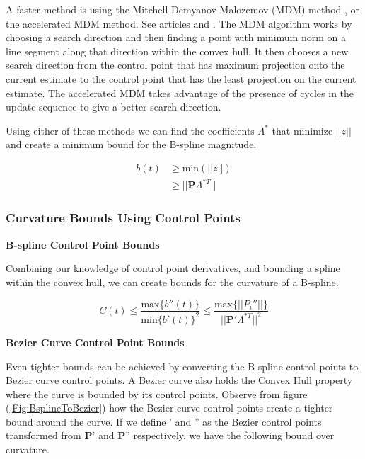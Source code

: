 \documentclass{article}
\begin{document}
A faster method is using the Mitchell-Demyanov-Malozemov (MDM) method \cite{ARTICLE:Kaown}, or the accelerated MDM method. See articles \cite{ARTICLE:Vladimirovich} and \cite{ARTICLE:Barbero}. The MDM algorithm works by choosing a search direction and then finding a point with minimum norm on a line segment along that direction within the convex hull. It then chooses a new search direction from the control point that has maximum projection onto the current estimate to the control point that has the least projection on the current estimate. The accelerated MDM takes advantage of the presence of cycles in the update sequence to give a better search direction.

Using either of these methods we can find the coefficients  \(\Lambda^*\)  that minimize \(||z||\) and create a minimum bound for the B-spline magnitude.

\begin{equation}
\begin{aligned}
    b(t) & \geq \text{min}(||z||) \\
    & \geq ||\textbf{P} \Lambda^{*T}||
\end{aligned}
\end{equation}

\subsubsection{Curvature Bounds Using Control Points}

\hspace{1cm}

\textbf{B-spline Control Point Bounds}

\hspace{1cm}

Combining our knowledge of control point derivatives, and bounding a spline within the convex hull, we can create bounds for the curvature of a B-spline.

\begin{equation}
    C(t) \leq \frac{\text{max}\{b''(t)\}}{\text{min}\{b'(t)\}^2} \leq \frac{\text{max}\{||P_i''||\}}{||\textbf{P}' \Lambda^{*T}||^2}
\end{equation}

\hspace{1cm}

\textbf{Bezier Curve Control Point Bounds}

\hspace{1cm}

Even tighter bounds can be achieved by converting the B-spline control points to Bezier curve control points. A Bezier curve also holds the Convex Hull property where the curve is bounded by its control points. Observe from figure (\ref{Fig:BsplineToBezier}) how the Bezier curve control points create a tighter bound around the curve. If we define \boldsymbol{\beta}' and \boldsymbol{\beta}'' as the Bezier control points  transformed from \textbf{P}' and \textbf{P}'' respectively, we have the following bound over curvature.
\end{document}
